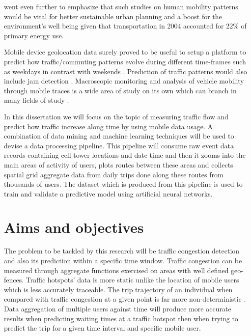 \documentclass[12pt, a4paper]{report}
\theoremstyle{definition}
\theoremstyle{definition}%
\theoremstyle{definition}%
\theoremstyle{definition}%
\theoremstyle{definition}%
\theoremstyle{definition}%
\begin{document}
\cite{Calabrese2013} went even further to emphasize that such studies on human mobility patterns would be vital for better sustainable urban planning and a boost for the environment's well being given that transportation in 2004 accounted for 22\% of primary energy use.

Mobile device geolocation data surely proved to be useful to setup a platform to predict how traffic/commuting patterns evolve during different time-frames such as weekdays in contrast with weekends \cite{Steenbruggen2015}. Prediction of traffic patterns would also include jam detection \cite{Hoteit2014}.  Macroscopic monitoring and analysis of vehicle mobility through mobile traces is a wide area of study on its own which can branch in many fields of study \cite{Steenbruggen2015}. 

In this dissertation we will focus on the topic of measuring traffic flow and predict how traffic increase along time by using mobile data usage. A combination of data mining and machine learning techniques will be used to devise a data processing pipeline. This pipeline will consume raw event data records containing cell tower locations and date time and then it zooms into the main areas of activity of users, plots routes between these areas and collects spatial grid aggregate data from daily trips done along these routes from thousands of users. The dataset which is produced from this pipeline is used to train and validate a predictive model using artificial neural networks.

\section{Aims and objectives} \label{section:introduction:aims_objectives}

The problem to be tackled by this research will be traffic congestion detection and also its prediction within a specific time window. Traffic congestion can be measured through aggregate functions exercised on areas with well defined geo-fences. Traffic hotspots' data is more static unlike the location of mobile users which is less accurately traceable. The trip trajectory of an individual when compared with traffic congestion at a given point is far more non-deterministic \cite{Jarv2012}. Data aggregation of multiple users against time will produce more accurate results when predicting waiting times at a traffic hotspot then when trying to predict the trip for a given time interval and specific mobile user.
\end{document}
